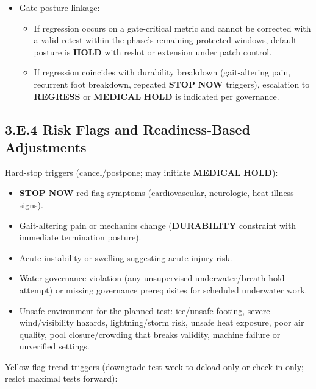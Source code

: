 \documentclass[10pt]{article}
\begin{document}
\begin{itemize}
\item Gate posture linkage:
\begin{itemize}
\item If regression occurs on a gate-critical metric and cannot be corrected with a valid retest within the phase’s remaining protected windows, default posture is \textbf{HOLD} with reslot or extension under patch control.
\item If regression coincides with durability breakdown (gait-altering pain, recurrent foot breakdown, repeated \textbf{STOP} \textbf{NOW} triggers), escalation to \textbf{REGRESS} or \textbf{MEDICAL} \textbf{HOLD} is indicated per governance.
\end{itemize}
\end{itemize}

\subsection*{3.E.4 Risk Flags and Readiness-Based Adjustments}
{}

Hard-stop triggers (cancel/postpone; may initiate \textbf{MEDICAL} \textbf{HOLD}):

\begin{itemize}
\item \textbf{STOP} \textbf{NOW} red-flag symptoms (cardiovascular, neurologic, heat illness signs).
\item Gait-altering pain or mechanics change (\textbf{DURABILITY} constraint with immediate termination posture).
\item Acute instability or swelling suggesting acute injury risk.
\item Water governance violation (any unsupervised underwater/breath-hold attempt) or missing governance prerequisites for scheduled underwater work.
\item Unsafe environment for the planned test: ice/unsafe footing, severe wind/visibility hazards, lightning/storm risk, unsafe heat exposure, poor air quality, pool closure/crowding that breaks validity, machine failure or unverified settings.
\end{itemize}

Yellow-flag trend triggers (downgrade test week to deload-only or check-in-only; reslot maximal tests forward):
\end{document}
